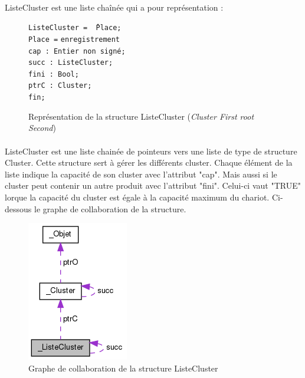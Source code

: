 \documentclass[twoside,UTF8]{EPURapport}
\begin{document}
\paragraph{}
ListeCluster est une liste cha\^inée qui a pour représentation :

\begin{figure}[!h]

\begin{tabbing}
\texttt{ListeCluster = \^\,Place;} \\
\texttt{Place =} \= \texttt{enregistrement} \\
\> \texttt{cap : Entier non signé;} \\
\> \texttt{succ : ListeCluster;} \\
\> \texttt{fini : Bool;} \\
\> \texttt{ptrC : Cluster;} \\
\> \texttt{fin; } \\
\end{tabbing}

\caption{Représentation de la structure ListeCluster (\textit{Cluster First root Second})}
\end{figure}

\paragraph{}ListeCluster est une liste chainée de pointeurs vers une liste de type de structure Cluster. Cette structure sert à gérer les différents cluster. Chaque élément de la liste indique la capacité de son cluster avec l'attribut "cap". Mais aussi si le cluster peut contenir un autre produit avec l'attribut "fini". Celui-ci vaut "TRUE" lorque la capacité du cluster est égale à la capacité maximum du chariot.
Ci-dessous le graphe de collaboration de la structure.

\begin{figure}[!h]
\center
\includegraphics[scale=0.5]{images/struct_liste_cluster.png}
\caption{Graphe de collaboration de la structure ListeCluster}
\end{figure} 
\end{document}
